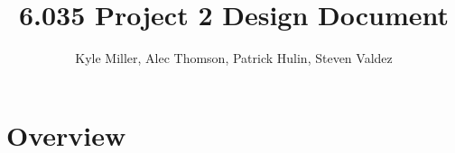 \documentclass[11pt]{article}
\title{6.035 Project 2 Design Document}
\author{Kyle Miller, Alec Thomson, Patrick Hulin, Steven Valdez}
\begin{document}
\maketitle

\section{Overview}
\end{document}
